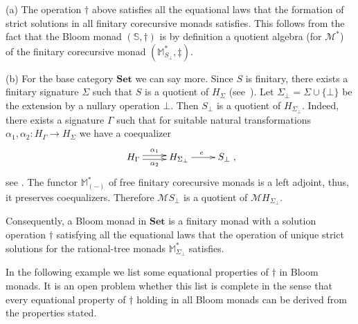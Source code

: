 \documentclass{LMCS}
\theoremstyle{plain}
\theoremstyle{definition}
\numberwithin{equation}{section}
\begin{document}
\begin{rem}\label{re equational prop}
(a) The operation $\dag$ above satisfies all the equational laws that the formation of strict solutions in all finitary corecursive monads satisfies. This follows from the fact that the Bloom monad $(\mathbb S,\dag)$ is by definition a quotient algebra (for $\mathcal M^*$) of the finitary corecursive monad $(\mathbb M^*_{S_\bot},\ddag)$.

(b) For the base category $\mathbf{Set}$ we can say more. Since $S$ is
finitary, there exists a finitary signature $\Sigma$ such that $S$ is
a quotient of $H_\Sigma$ (see~\cite{at}). Let $\Sigma_\bot=\Sigma\cup \{\bot\}$ be the extension by a nullary operation $\bot$. Then $S_\bot$ is a quotient of $H_{\Sigma_\bot}$. Indeed, there exists a signature $\Gamma$ such that for suitable natural transformations $\alpha_1,\alpha_2:H_\Gamma\to H_\Sigma$ we have a coequalizer
$$\xymatrix{H_\Gamma\ar@<2pt>[r]^-{\alpha_1}\ar@<-2pt>[r]_-{\alpha_2}&H_{\Sigma_\bot}\ar[r]^e&S_\bot},$$
see \cite{amm12}. The functor $\mathbb M^*_{(-)}$ of free  finitary corecursive monads is a left adjoint, thus, it preserves coequalizers. Therefore $\mathcal{M}S_\bot$ is a quotient of $\mathcal{M}H_{\Sigma_\bot}$.

Consequently, a Bloom monad in $\mathbf{Set}$ is a finitary monad with a solution operation $\dag$ satisfying all the equational laws that the operation of unique strict solutions for the rational-tree monads $\mathbb M^*_{\Sigma_\bot}$ satisfies.
\end{rem}

In the following example we list some equational properties of $\dag$
in Bloom monads. It is an open problem whether this list is complete
in the sense that every equational property of $\dag$ holding in all
Bloom monads can be derived from the properties stated.
\end{document}

